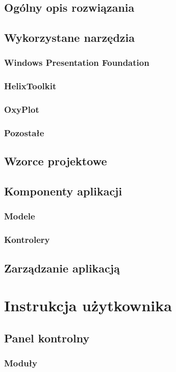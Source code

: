 \documentclass[12pt, oneside]{report}
\theoremstyle{definition}
\begin{document}
\section{Ogólny opis rozwiązania}
\section{Wykorzystane narzędzia}
\subsection{Windows Presentation Foundation}
\subsection{HelixToolkit}
\subsection{OxyPlot}
\subsection{Pozostałe}
\section{Wzorce projektowe}
\section{Komponenty aplikacji}
\subsection{Modele}
\subsection{Kontrolery}
\section{Zarządzanie aplikacją}


\chapter{Instrukcja użytkownika}
\section{Panel kontrolny}
\subsection{Moduły}
\end{document}
